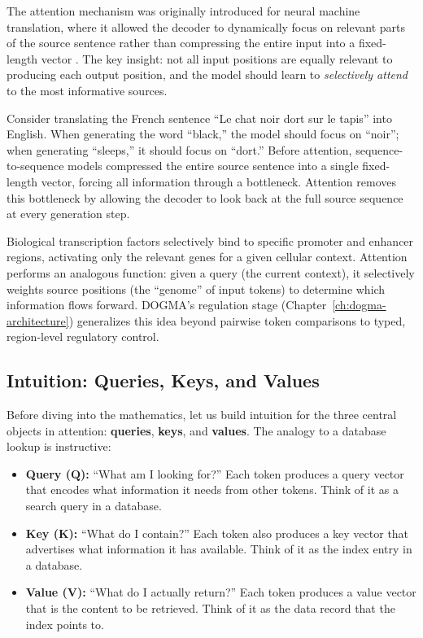The attention mechanism was originally introduced for neural machine translation, where it allowed the decoder to dynamically focus on relevant parts of the source sentence rather than compressing the entire input into a fixed-length vector \citep{bahdanau2015}. The key insight: not all input positions are equally relevant to producing each output position, and the model should learn to \emph{selectively attend} to the most informative sources.

Consider translating the French sentence ``Le chat noir dort sur le tapis'' into English. When generating the word ``black,'' the model should focus on ``noir''; when generating ``sleeps,'' it should focus on ``dort.'' Before attention, sequence-to-sequence models compressed the entire source sentence into a single fixed-length vector, forcing all information through a bottleneck. Attention removes this bottleneck by allowing the decoder to look back at the full source sequence at every generation step.

\begin{bioinsight}
Biological transcription factors selectively bind to specific promoter and enhancer regions, activating only the relevant genes for a given cellular context. Attention performs an analogous function: given a query (the current context), it selectively weights source positions (the ``genome'' of input tokens) to determine which information flows forward. DOGMA's regulation stage (Chapter~\ref{ch:dogma-architecture}) generalizes this idea beyond pairwise token comparisons to typed, region-level regulatory control.
\end{bioinsight}

\subsection{Intuition: Queries, Keys, and Values}
\label{sec:qkv-intuition}

Before diving into the mathematics, let us build intuition for the three central objects in attention: \textbf{queries}, \textbf{keys}, and \textbf{values}. The analogy to a database lookup is instructive:

\begin{itemize}[leftmargin=1.5em]
  \item \textbf{Query ($\mathbf{Q}$):} ``What am I looking for?'' Each token produces a query vector that encodes what information it needs from other tokens. Think of it as a search query in a database.
  \item \textbf{Key ($\mathbf{K}$):} ``What do I contain?'' Each token also produces a key vector that advertises what information it has available. Think of it as the index entry in a database.
  \item \textbf{Value ($\mathbf{V}$):} ``What do I actually return?'' Each token produces a value vector that is the content to be retrieved. Think of it as the data record that the index points to.
\end{itemize}

